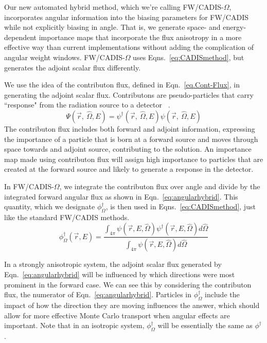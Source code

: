 \documentclass[12pt]{article}
\begin{document}
Our new automated hybrid method, which we're calling FW/CADIS-$\Omega$, incorporates angular information into the biasing parameters for FW/CADIS while not explicitly biasing in angle. 
That is, we generate space- and energy-dependent importance maps that incorporate the flux anisotropy in a more effective way than current implementations without adding the complication of angular weight windows. 
FW/CADIS-$\Omega$ uses Eqns.~\eqref{eq:CADISmethod}, but generates the adjoint scalar flux differently. 

We use the idea of the contributon flux, defined in Eqn.~\eqref{eq.Cont-Flux}, in generating the adjoint scalar flux. 
Contributons are pseudo-particles that carry ``response" from the radiation source to a detector ~\cite{williams_generalized_1991,williams_contributorn_1992,williams_contributon_study}. 
%
\begin{equation}
\Psi (\vec {r},\:\hat\Omega ,E) = \psi^{\dagger} (\vec {r},\:\hat\Omega ,E) \psi(\vec {r} ,\:\hat\Omega,E)
\label{eq.Cont-Flux} 
\end{equation}
%
The contributon flux includes both forward and adjoint information, expressing the importance of a particle that is born at a forward source and moves through space towards and adjoint source, contributing to the solution.
An importance map made using contributon flux will assign high importance to particles that are created at the forward source and likely to generate a response in the detector. 

In FW/CADIS-$\Omega$, we integrate the contributon flux over angle and divide by the integrated forward angular flux as shown in Eqn.~\eqref{eq:angularhybrid}.
This quantity, which we designate $\phi^{\dagger}_{\Omega}$, is then used in Eqns.~\eqref{eq:CADISmethod}, just like the standard FW/CADIS methods.
%
\begin{equation} 
\phi^{\dagger}_{\Omega}(\vec{r},E) = \frac{\int_{4\pi} \psi(\vec {r} ,E,\hat{\Omega})\psi^{\dagger}(\vec {r} ,E,\hat{\Omega})d\hat\Omega }{\int_{4\pi}\psi(\vec {r} ,E,\hat{\Omega})d\hat\Omega}
\label{eq:angularhybrid}
\end{equation}

In a strongly anisotropic system, the adjoint scalar flux generated by Eqn.~\eqref{eq:angularhybrid} will be influenced by which directions were most prominent in the forward case. 
We can see this by considering the contributon flux, the numerator of Eqn.~\eqref{eq:angularhybrid}.
Particles in $\phi^{\dagger}_{\Omega}$ include the impact of how the direction they are moving influences the answer, 
which should allow for more effective Monte Carlo transport when angular effects are important. 
Note that in an isotropic system, $\phi^{\dagger}_{\Omega}$ will be essentially the same as $\phi^{\dagger}$. 
\end{document}

